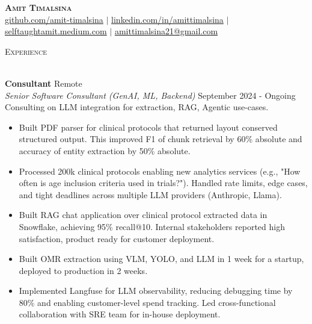 \documentclass[a4paper]{article}
\newcommand{\lineunder} {
    \vspace*{-8pt} \\
    \hspace*{-18pt} \hrulefill \\
}
\newcommand{\header} [1] {
    {\hspace*{-18pt}\vspace*{6pt} \textsc{#1}}
    \vspace*{-6pt} \lineunder
}
\begin{document}
\vspace*{-40pt}

    

\vspace*{-10pt}
\begin{center}
	\textbf{\Huge \scshape {Amit Timalsina}} \\ \vspace{3pt}
    \small
    \href{https://github.com/amit-timalsina}{github.com/amit-timalsina}
    $|$
    \href{https://www.linkedin.com/in/amittimalsina}{linkedin.com/in/amittimalsina}
    $|$
    \href{https://selftaughtamit.medium.com/}{selftaughtamit.medium.com}
    $|$
    \href{mailto:amittimalsina21@gmail.com}{amittimalsina21@gmail.com} \\
\end{center}

\header{Experience}
\vspace{1mm}

\textbf{Consultant} \hfill Remote\\
\textit{Senior Software Consultant (GenAI, ML, Backend)} \hfill September 2024 - Ongoing\\
{Consulting on LLM integration for extraction, RAG, Agentic use-cases.}
\vspace{-1mm}
\begin{itemize} \itemsep 0pt
	\item Built PDF parser for clinical protocols that returned layout conserved structured output. This improved F1 of chunk retrieval by 60\% absolute and accuracy of entity extraction by 50\% absolute.
	\item Processed 200k clinical protocols enabling new analytics services (e.g., "How often is age inclusion criteria used in trials?"). Handled rate limits, edge cases, and tight deadlines across multiple LLM providers (Anthropic, Llama).
	\item Built RAG chat application over clinical protocol extracted data in Snowflake, achieving 95\% recall@10. Internal stakeholders reported high satisfaction, product ready for customer deployment.
    \item Built OMR extraction using VLM, YOLO, and LLM in 1 week for a startup, deployed to production in 2 weeks. 
	\item Implemented Langfuse for LLM observability, reducing debugging time by 80\% and enabling customer-level spend tracking. Led cross-functional collaboration with SRE team for in-house deployment.
\end{itemize}
\end{document}
